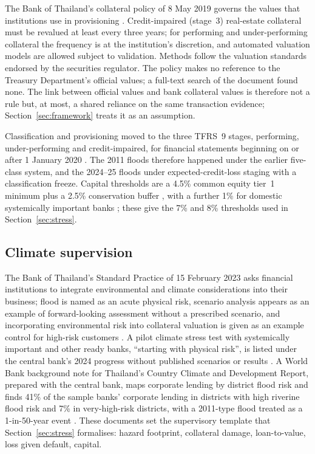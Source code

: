 The Bank of Thailand's collateral policy of 8 May 2019 governs the values that institutions use in provisioning \citep{bot2019collateral}. Credit-impaired (stage~3) real-estate collateral must be revalued at least every three years; for performing and under-performing collateral the frequency is at the institution's discretion, and automated valuation models are allowed subject to validation. Methods follow the valuation standards endorsed by the securities regulator. The policy makes no reference to the Treasury Department's official values; a full-text search of the document found none. The link between official values and bank collateral values is therefore not a rule but, at most, a shared reliance on the same transaction evidence; Section~\ref{sec:framework} treats it as an assumption.

Classification and provisioning moved to the three TFRS~9 stages, performing, under-performing and credit-impaired, for financial statements beginning on or after 1 January 2020 \citep{bot2018tfrs9}. The 2011 floods therefore happened under the earlier five-class system, and the 2024--25 floods under expected-credit-loss staging with a classification freeze. Capital thresholds are a 4.5\% common equity tier~1 minimum plus a 2.5\% conservation buffer \citep{bot2012capital}, with a further 1\% for domestic systemically important banks \citep{bot2017dsib}; these give the 7\% and 8\% thresholds used in Section~\ref{sec:stress}.

\subsection{Climate supervision}

The Bank of Thailand's Standard Practice of 15 February 2023 asks financial institutions to integrate environmental and climate considerations into their business; flood is named as an acute physical risk, scenario analysis appears as an example of forward-looking assessment without a prescribed scenario, and incorporating environmental risk into collateral valuation is given as an example control for high-risk customers \citep{BOT_StandardPractice_page}. A pilot climate stress test with systemically important and other ready banks, ``starting with physical risk'', is listed under the central bank's 2024 progress without published scenarios or results \citep{bot2025sustainability2567}. A World Bank background note for Thailand's Country Climate and Development Report, prepared with the central bank, maps corporate lending by district flood risk and finds 41\% of the sample banks' corporate lending in districts with high riverine flood risk and 7\% in very-high-risk districts, with a 2011-type flood treated as a 1-in-50-year event \citep{worldbank2026ccdrfin,dolk2025assessing}. These documents set the supervisory template that Section~\ref{sec:stress} formalises: hazard footprint, collateral damage, loan-to-value, loss given default, capital.
